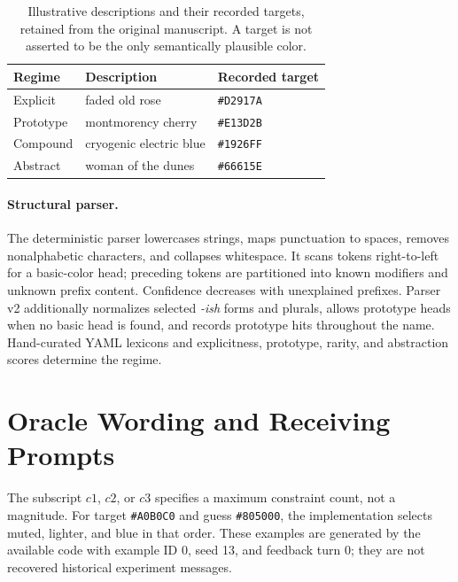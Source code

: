 \begin{table}[H]
\centering\small
\begin{tabular}{@{}lp{}l@{}}
\toprule
Regime & Description & Recorded target \\
\midrule
Explicit & faded old rose & \texttt{\#D2917A} \\
Prototype & montmorency cherry & \texttt{\#E13D2B} \\
Compound & cryogenic electric blue & \texttt{\#1926FF} \\
Abstract & woman of the dunes & \texttt{\#66615E} \\
\bottomrule
\end{tabular}
\caption{Illustrative descriptions and their recorded targets, retained
from the original manuscript. A target is not asserted to be the only
semantically plausible color.}
\end{table}

\paragraph{Structural parser.}
The deterministic parser lowercases strings, maps punctuation to spaces,
removes nonalphabetic characters, and collapses whitespace. It scans tokens
right-to-left for a basic-color head; preceding tokens are partitioned into
known modifiers and unknown prefix content. Confidence decreases with
unexplained prefixes. Parser v2 additionally normalizes selected \emph{-ish}
forms and plurals, allows prototype heads when no basic head is found, and
records prototype hits throughout the name. Hand-curated YAML lexicons and
explicitness, prototype, rarity, and abstraction scores determine the regime.

\section{Oracle Wording and Receiving Prompts}
\label{app:bandwidth_wording_examples}

The subscript $c1$, $c2$, or $c3$ specifies a maximum constraint count,
not a magnitude. For target \texttt{\#A0B0C0} and guess \texttt{\#805000},
the implementation selects muted, lighter, and blue in that order. These
examples are generated by the available code with example ID 0, seed 13,
and feedback turn 0; they are not recovered historical experiment messages.

